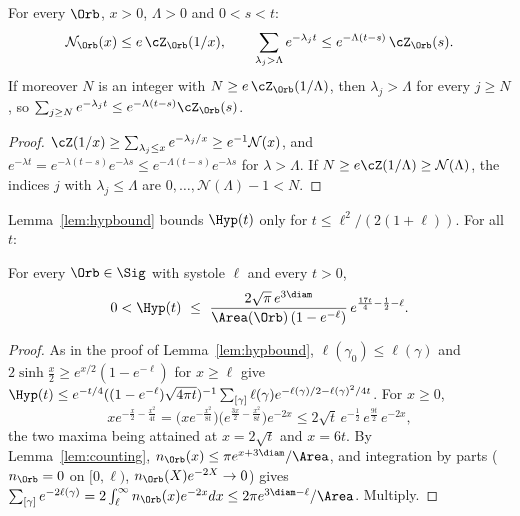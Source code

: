 \begin{proposition}\label{eig:counttail}
For every $\Orb$, $x>0$, $\Lambda>0$ and $0<s<t$:
\[
  \mathcal N_\Orb(x)\le e\,\cZ_\Orb(1/x),\qquad \sum_{\lambda_j>\Lambda}e^{-\lambda_jt}\le e^{-\Lambda(t-s)}\,\cZ_\Orb(s).
\]
If moreover $N$ is an integer with $N\ge e\,\cZ_\Orb(1/\Lambda)$, then $\lambda_j>\Lambda$ for every $j\ge N$, so $\sum_{j\ge N}e^{-\lambda_jt}\le e^{-\Lambda(t-s)}\cZ_\Orb(s)$.
\end{proposition}

\begin{proof}
$\cZ(1/x)\ge\sum_{\lambda_j\le x}e^{-\lambda_j/x}\ge e^{-1}\mathcal N(x)$, and $e^{-\lambda t}=e^{-\lambda(t-s)}e^{-\lambda s}\le e^{-\Lambda(t-s)}e^{-\lambda s}$ for $\lambda>\Lambda$. If $N\ge e\cZ(1/\Lambda)\ge\mathcal N(\Lambda)$, the indices $j$ with $\lambda_j\le\Lambda$ are $0,\dots,\mathcal N(\Lambda)-1<N$.
\end{proof}

Lemma~\ref{lem:hypbound} bounds $\Hyp(t)$ only for $t\le\ell^2/(2(1+\ell))$. For all $t$:

\begin{proposition}\label{eig:hypall}
For every $\Orb\in\Sig$ with systole $\ell$ and every $t>0$,
\[
  0<\Hyp(t)\ \le\ \frac{2\sqrt\pi\,e^{3\diam}}{\Area(\Orb)\,(1-e^{-\ell})}\,e^{\frac{17t}4-\frac12-\ell}.
\]
\end{proposition}

\begin{proof}
As in the proof of Lemma~\ref{lem:hypbound}, $\ell(\gamma_0)\le\ell(\gamma)$ and $2\sinh\frac x2\ge e^{x/2}(1-e^{-\ell})$ for $x\ge\ell$ give $\Hyp(t)\le e^{-t/4}((1-e^{-\ell})\sqrt{4\pi t})^{-1}\sum_{[\gamma]}\ell(\gamma)e^{-\ell(\gamma)/2-\ell(\gamma)^2/4t}$. For $x\ge0$,
\[
  xe^{-\frac x2-\frac{x^2}{4t}}=\big(xe^{-\frac{x^2}{8t}}\big)\big(e^{\frac{3x}2-\frac{x^2}{8t}}\big)e^{-2x}\le2\sqrt t\,e^{-\frac12}\,e^{\frac{9t}2}\,e^{-2x},
\]
the two maxima being attained at $x=2\sqrt t$ and $x=6t$. By Lemma~\ref{lem:counting}, $n_\Orb(x)\le\pi e^{x+3\diam}/\Area$, and integration by parts ($n_\Orb=0$ on $[0,\ell)$, $n_\Orb(X)e^{-2X}\to0$) gives $\sum_{[\gamma]}e^{-2\ell(\gamma)}=2\int_\ell^\infty n_\Orb(x)e^{-2x}dx\le2\pi e^{3\diam-\ell}/\Area$. Multiply.
\end{proof}

